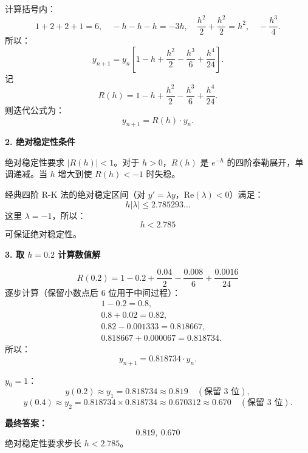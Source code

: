 \documentclass[lang=cn,newtx,12pt,scheme=chinese]{elegantbook}
\begin{document}
\begin{solution}
	计算括号内：
	\[
	1 + 2 + 2 + 1 = 6, \quad
	- h - h - h = -3h, \quad
	\frac{h^2}{2} + \frac{h^2}{2} = h^2, \quad
	- \frac{h^3}{4}.
	\]
	所以：
	\[
	y_{n+1} = y_n\left[1 - h + \frac{h^2}{2} - \frac{h^3}{6} + \frac{h^4}{24}\right].
	\]
	记
	\[
	R(h) = 1 - h + \frac{h^2}{2} - \frac{h^3}{6} + \frac{h^4}{24}.
	\]
	则迭代公式为：
	\[
	y_{n+1} = R(h) \cdot y_n.
	\]
	
	\noindent\textbf{2. 绝对稳定性条件}
	
	绝对稳定性要求 $|R(h)| < 1$。对于 $h > 0$，$R(h)$ 是 $e^{-h}$ 的四阶泰勒展开，单调递减。当 $h$ 增大到使 $R(h) < -1$ 时失稳。
	
	经典四阶 R-K 法的绝对稳定区间（对 $y' = \lambda y$，$\mathrm{Re}(\lambda) < 0$）满足：
	\[
	h|\lambda| \le 2.785293\ldots
	\]
	这里 $\lambda = -1$，所以：
	\[
	h < 2.785
	\]
	可保证绝对稳定性。
	
	\noindent\textbf{3. 取 $h=0.2$ 计算数值解}
	
	\[
	R(0.2) = 1 - 0.2 + \frac{0.04}{2} - \frac{0.008}{6} + \frac{0.0016}{24}
	\]
	逐步计算（保留小数点后 6 位用于中间过程）：
	\[
	\begin{aligned}
		&1 - 0.2 = 0.8, \\
		&0.8 + 0.02 = 0.82, \\
		&0.82 - 0.001333 = 0.818667, \\
		&0.818667 + 0.000067 = 0.818734.
	\end{aligned}
	\]
	所以：
	\[
	y_{n+1} = 0.818734 \cdot y_n.
	\]
	
	$y_0 = 1$：
	\[
	y(0.2) \approx y_1 = 0.818734 \approx 0.819 \quad (\text{保留 3 位}),
	\]
	\[
	y(0.4) \approx y_2 = 0.818734 \times 0.818734 \approx 0.670312 \approx 0.670 \quad (\text{保留 3 位}).
	\]
	
	\noindent\textbf{最终答案：}
	\[
	\boxed{0.819, \ 0.670}
	\]
	绝对稳定性要求步长 $h < 2.785$。
\end{solution}
\end{document}
